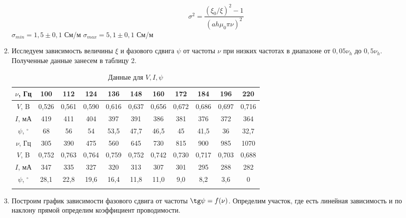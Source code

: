 \documentclass[a4paper, 12pt]{article}%
\begin{document}
\begin{enumerate}
	$$ \sigma^2 = \frac{(\xi_0/\xi)^2 - 1}{(ah\mu_0\pi\nu)^2} $$
	$ \sigma_{min} =  1,5 \pm 0,1$ См/м
	$ \sigma_{max} =  5,1 \pm 0,1$ См/м
	
		\newpage
		
	\item Исследуем зависимость величины $\xi$ и фазового сдвига $\psi$ от частоты
	$\nu$ при низких частотах в диапазоне от $0,05\nu_h \text{ до }  0,5\nu_h$. Полученные данные занесем в таблицу 2.
	
	\begin{longtable} {|c|c|c|c|c|c|c|c|c|c|c|}
		\hline
		$\nu$, Гц& 100 & 112 & 124 & 136 & 148 & 160 & 172 & 184 & 196 & 220  \\ \hline
		
		$V$, B & 0,526 & 0,561 & 0,590 & 0,616 & 0,637 & 0,656 & 0,672 & 0,686 & 0,697 & 0,716 \\ \hline
		
		$I$, мА& 419 & 411 & 404 & 397 & 391 & 386 & 381 & 376 & 372 & 364  \\ \hline
		
		$\psi$, $^\circ$ & 68 & 56 & 54 & 53,5 & 47,7 & 46,5 & 45 & 41,5 & 36 & 32,7   \\ \hline
		\hline
		\hline
		
		$\nu$, Гц & 305 & 390 & 475 & 560 & 645 & 730 & 815 & 900 & 985 & 1070   \\ \hline
		
		$V$, B  & 0,752 & 0,763 & 0,764 & 0,759 & 0,752 & 0,742 & 0,730 & 0,717 & 0,703 & 0,688  \\ \hline
		
		$I$, мА& 347 & 335 & 327 & 320 & 313 & 307 & 301 & 295 & 288 & 282  \\ \hline
		
		$\psi$, $^\circ$ & 28,1 & 22,8 & 19,6 & 16,4 & 11,8 & 11,0 & 9,0 & 8,2 & 3,6 & 0  \\ \hline
		
		\caption{Данные для $V, I, \psi$}
	\end{longtable}	
	\item Построим график зависимости фазового сдвига от частоты $\tg \psi = f(\nu)$. Определим участок, где есть линейная зависимость и по наклону прямой определим коэффициент проводимости.
	

\end{enumerate}
\end{document}

